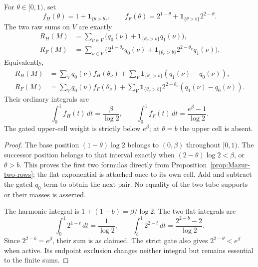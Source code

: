 \begin{proposition}
\label{prop:Mazur-profile-phase}
For $\theta\in[0,1)$, set
\[
 f_H(\theta)=1+\mathbf1_{\{\theta>b\}},\qquad
 f_F(\theta)=2^{1-\theta}
                 +\mathbf1_{\{\theta>b\}}2^{2-\theta}.
\]
The two raw sums on $V$ are exactly
\begin{align}
 R_H(M)&=\sum_{\nu\in V}
        \big(q_0(\nu)+\mathbf1_{\{\theta_\nu>b\}}q_1(\nu)\big),\\
 R_F(M)&=\sum_{\nu\in V}
        \big(2^{1-\theta_\nu}q_0(\nu)
          +\mathbf1_{\{\theta_\nu>b\}}2^{2-\theta_\nu}q_1(\nu)\big).
 \label{eq:Mazur-literal-profiles}
\end{align}
Equivalently,
\begin{align}
 R_H(M)&=\sum_Vq_0(\nu)f_H(\theta_\nu)
       +\sum_V\mathbf1_{\{\theta_\nu>b\}}(q_1(\nu)-q_0(\nu)),\\
 R_F(M)&=\sum_Vq_0(\nu)f_F(\theta_\nu)
       +\sum_V\mathbf1_{\{\theta_\nu>b\}}2^{2-\theta_\nu}
                                      (q_1(\nu)-q_0(\nu)).
 \label{eq:Mazur-neighbour-residual}
\end{align}
Their ordinary integrals are
\begin{equation}
 \int_0^1 f_H(t)\,dt=\frac{\beta}{\log2},\qquad
 \int_0^1 f_F(t)\,dt=\frac{e^\beta-1}{\log2}.
 \label{eq:Mazur-phase-means}
\end{equation}
The gated upper-cell weight is strictly below $e^\beta$;
at $\theta=b$ the upper cell is absent.
\end{proposition}
\begin{proof}
The base position $(1-\theta)\log2$ belongs to $(0,\beta)$
throughout $[0,1)$. The successor position belongs to that
interval exactly when $(2-\theta)\log2<\beta$, or $\theta>b$.
This proves the first two formulas directly from
Proposition~\ref{prop:Mazur-two-rows}; the flat exponential is
attached once to its own cell. Add and subtract the gated $q_0$
term to obtain the next pair. No equality of the two tube supports
or their masses is asserted.

The harmonic integral is $1+(1-b)=\beta/\log2$.
The two flat integrals are
\[
 \int_0^1 2^{1-t}\,dt=\frac1{\log2},\qquad
 \int_b^1 2^{2-t}\,dt=\frac{2^{2-b}-2}{\log2}.
\]
Since $2^{2-b}=e^\beta$, their sum is as claimed.
The strict gate also gives $2^{2-\theta}<e^\beta$ when active.
Its endpoint exclusion changes neither integral but remains
essential to the finite sums.
\end{proof}

